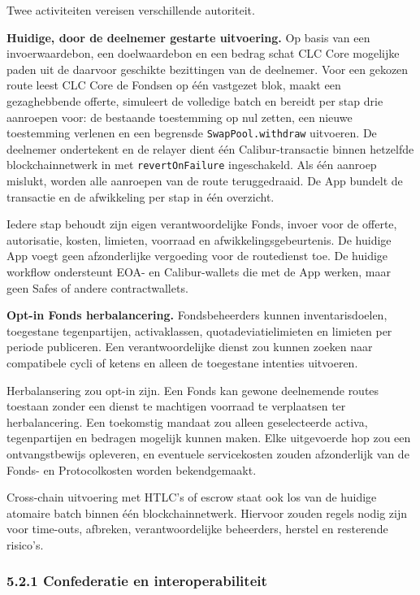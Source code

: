 \documentclass[11pt]{article}
\begin{document}
Twee activiteiten vereisen verschillende autoriteit.

\textbf{Huidige, door de deelnemer gestarte uitvoering.} Op basis van een invoerwaardebon, een doelwaardebon en een bedrag schat CLC Core mogelijke paden uit de daarvoor geschikte bezittingen van de deelnemer. Voor een gekozen route leest CLC Core de Fondsen op één vastgezet blok, maakt een gezaghebbende offerte, simuleert de volledige batch en bereidt per stap drie aanroepen voor: de bestaande toestemming op nul zetten, een nieuwe toestemming verlenen en een begrensde \texttt{SwapPool.withdraw} uitvoeren. De deelnemer ondertekent en de relayer dient één Calibur-transactie binnen hetzelfde blockchainnetwerk in met \texttt{revertOnFailure} ingeschakeld. Als één aanroep mislukt, worden alle aanroepen van de route teruggedraaid. De App bundelt de transactie en de afwikkeling per stap in één overzicht.

Iedere stap behoudt zijn eigen verantwoordelijke Fonds, invoer voor de offerte, autorisatie, kosten, limieten, voorraad en afwikkelingsgebeurtenis. De huidige App voegt geen afzonderlijke vergoeding voor de routedienst toe. De huidige workflow ondersteunt EOA- en Calibur-wallets die met de App werken, maar geen Safes of andere contractwallets.

\textbf{Opt-in Fonds herbalancering.} Fondsbeheerders kunnen inventarisdoelen, toegestane tegenpartijen, activaklassen, quotadeviatielimieten en limieten per periode publiceren. Een verantwoordelijke dienst zou kunnen zoeken naar compatibele cycli of ketens en alleen de toegestane intenties uitvoeren.

Herbalansering zou opt-in zijn. Een Fonds kan gewone deelnemende routes toestaan zonder een dienst te machtigen voorraad te verplaatsen ter herbalancering. Een toekomstig mandaat zou alleen geselecteerde activa, tegenpartijen en bedragen mogelijk kunnen maken. Elke uitgevoerde hop zou een ontvangstbewijs opleveren, en eventuele servicekosten zouden afzonderlijk van de Fonds- en Protocolkosten worden bekendgemaakt.

Cross-chain uitvoering met HTLC's of escrow staat ook los van de huidige atomaire batch binnen één blockchainnetwerk. Hiervoor zouden regels nodig zijn voor time-outs, afbreken, verantwoordelijke beheerders, herstel en resterende risico's.

\subsubsection*{5.2.1 Confederatie en interoperabiliteit}
\end{document}
